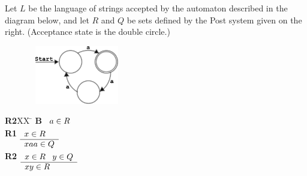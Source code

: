 \documentclass[addpoints]{exam}
\begin{document}
\begin{questions}


\question Let $L$ be the language of strings accepted by the automaton
described in the diagram below, and let $R$ and $Q$ be sets defined by
the Post system given on the right. (Acceptance state is the double circle.)

\begin{multicols}{2}
\begin{center}
\includegraphics[width=2.5in, height=1in,keepaspectratio=true]{1mod3automaton.pdf}

\end{center}

\begin{tabbing}
{\bf R2}XX \=  \kill
{\bf B} \>
        \(\begin{array}[t]{l}
        a \in R
        \end{array}\) \\[2ex]
{\bf R1} \>
        \(\begin{array}[t]{l}
        x\in R  \\
        \hline
        xaa \in Q
        \end{array}\) \\[2ex]
{\bf R2} \>
        \(\begin{array}[t]{l}
        x\in R\;\;\;y\in Q \\
        \hline
        xy \in R
        \end{array}\) 
\end{tabbing}
\end{multicols}


\end{questions}
\end{document}
